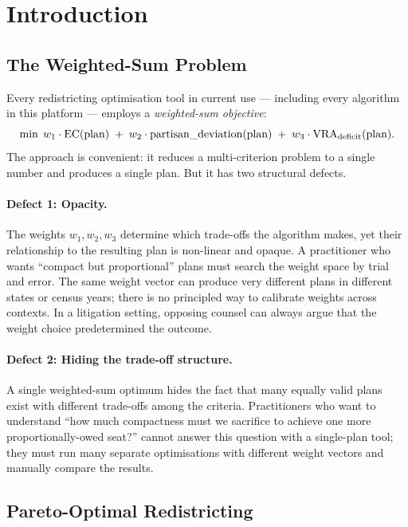 \section{Introduction}
\label{sec:introduction}

\subsection{The Weighted-Sum Problem}

Every redistricting optimisation tool in current use --- including every
algorithm in this platform --- employs a \emph{weighted-sum objective}:
\[
  \min\; w_1 \cdot \mathrm{EC}(\text{plan}) \;+\; w_2 \cdot \text{partisan\_deviation}(\text{plan})
        \;+\; w_3 \cdot \mathrm{VRA}_{\mathrm{deficit}}(\text{plan}).
\]
The approach is convenient: it reduces a multi-criterion problem to a single
number and produces a single plan.
But it has two structural defects.

\paragraph{Defect 1: Opacity.}
The weights $w_1, w_2, w_3$ determine which trade-offs the algorithm makes,
yet their relationship to the resulting plan is non-linear and opaque.
A practitioner who wants ``compact but proportional'' plans must search the
weight space by trial and error.
The same weight vector can produce very different plans in different states
or census years; there is no principled way to calibrate weights across contexts.
In a litigation setting, opposing counsel can always argue that the weight choice
predetermined the outcome.

\paragraph{Defect 2: Hiding the trade-off structure.}
A single weighted-sum optimum hides the fact that many equally valid plans
exist with different trade-offs among the criteria.
Practitioners who want to understand ``how much compactness must we sacrifice
to achieve one more proportionally-owed seat?'' cannot answer this question
with a single-plan tool; they must run many separate optimisations with
different weight vectors and manually compare the results.

\subsection{Pareto-Optimal Redistricting}

